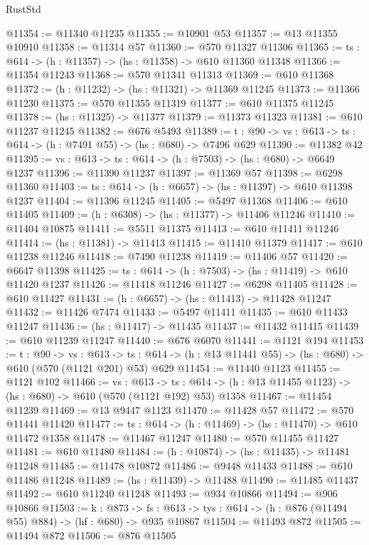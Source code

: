 \begin{lexlean}{RustStd}
\begin{coremodule}
@11354 := @11340 @11235
@11355 := @10901 @53
@11357 := @13 @11355 @10910
@11358 := @11314 @57
@11360 := @570 @11327 @11306
@11365 := {ts : @614} -> (h : @11357) -> (hs : @11358) -> @610 @11360 @11348
@11366 := @11354 @11243
@11368 := @570 @11341 @11313
@11369 := @610 @11368
@11372 := (h : @11232) -> (hs : @11321) -> @11369 @11245
@11373 := @11366 @11230
@11375 := @570 @11355 @11319
@11377 := @610 @11375 @11245
@11378 := (hs : @11325) -> @11377
@11379 := @11373 @11323
@11381 := @610 @11237 @11245
@11382 := @676 @5493
@11389 := {t : @90} -> {vs : @613} -> {ts : @614} -> (h : @7491 @55) -> (hs : @680) -> @7496 @629
@11390 := @11382 @42
@11395 := {vs : @613} -> {ts : @614} -> (h : @7503) -> (hs : @680) -> @6649 @1237
@11396 := @11390 @11237
@11397 := @11369 @57
@11398 := @6298 @11360
@11403 := {ts : @614} -> (h : @6657) -> (hs : @11397) -> @610 @11398 @1237
@11404 := @11396 @11245
@11405 := @5497 @11368
@11406 := @610 @11405
@11409 := (h : @6308) -> (hs : @11377) -> @11406 @11246
@11410 := @11404 @10875
@11411 := @5511 @11375
@11413 := @610 @11411 @11246
@11414 := (hs : @11381) -> @11413
@11415 := @11410 @11379
@11417 := @610 @11238 @11246
@11418 := @7490 @11238
@11419 := @11406 @57
@11420 := @6647 @11398
@11425 := {ts : @614} -> (h : @7503) -> (hs : @11419) -> @610 @11420 @1237
@11426 := @11418 @11246
@11427 := @6298 @11405
@11428 := @610 @11427
@11431 := (h : @6657) -> (hs : @11413) -> @11428 @11247
@11432 := @11426 @7474
@11433 := @5497 @11411
@11435 := @610 @11433 @11247
@11436 := (hs : @11417) -> @11435
@11437 := @11432 @11415
@11439 := @610 @11239 @11247
@11440 := @676 @6070
@11441 := @1121 @194
@11453 := {t : @90} ->
  {vs : @613} ->
  {ts : @614} -> (h : @13 @11441 @55) -> (hs : @680) -> @610 (@570 (@1121 @201) @53) @629
@11454 := @11440 @1123
@11455 := @1121 @102
@11466 := {vs : @613} ->
  {ts : @614} -> (h : @13 @11455 @1123) -> (hs : @680) -> @610 (@570 (@1121 @192) @53) @1358
@11467 := @11454 @11239
@11469 := @13 @9447 @1123
@11470 := @11428 @57
@11472 := @570 @11441 @11420
@11477 := {ts : @614} -> (h : @11469) -> (hs : @11470) -> @610 @11472 @1358
@11478 := @11467 @11247
@11480 := @570 @11455 @11427
@11481 := @610 @11480
@11484 := (h : @10874) -> (hs : @11435) -> @11481 @11248
@11485 := @11478 @10872
@11486 := @9448 @11433
@11488 := @610 @11486 @11248
@11489 := (hs : @11439) -> @11488
@11490 := @11485 @11437
@11492 := @610 @11240 @11248
@11493 := @934 @10866
@11494 := @906 @10866
@11503 := {k : @873} ->
  {fs : @613} -> {tys : @614} -> (h : @876 (@11494 @55) @884) -> (hf : @680) -> @935 @10867
@11504 := @11493 @872
@11505 := @11494 @872
@11506 := @876 @11505

\end{coremodule}
\end{lexlean}
